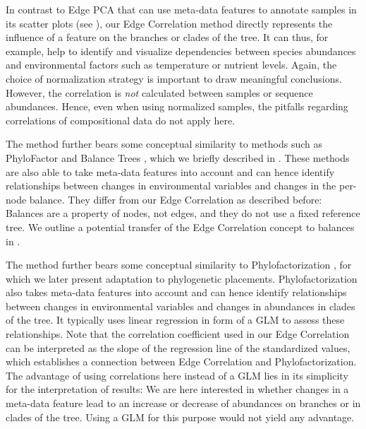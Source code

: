 In contrast to Edge PCA \cite{Matsen2011a} that can use meta-data features to annotate samples in its scatter plots
(see ),
our Edge Correlation method directly represents the influence of a feature on the branches or clades of the tree.
It can thus, for example, help to identify and visualize dependencies
between species abundances and environmental factors such as temperature or nutrient levels.
Again, the choice of normalization strategy is important to draw meaningful conclusions.
However, the correlation is \emph{not} calculated between samples or sequence abundances.
Hence, even when using normalized samples, %
the pitfalls regarding correlations of compositional data \cite{Lovell2015} do not apply here.


The method further bears some conceptual similarity to methods
such as Phylo\-Factor \cite{Washburne2017a} and Balance Trees \cite{Morton2017},
which we briefly described in .
These methods are also able to take meta-data features into account and
can hence identify relationships between changes in environmental variables and changes in the per-node balance.
They differ from our Edge Correlation as described before:
Balances are a property of nodes, not edges, and they do not use a fixed reference tree.
We outline a potential transfer of the Edge Correlation concept to balances in .


The method further bears some conceptual similarity to Phylofactorization \cite{Washburne2017a},
for which we later present adaptation to phylogenetic placements.
Phylofactorization also takes meta-data features into account and can hence identify relationships
between changes in environmental variables and changes in abundances in clades of the tree.
It typically uses linear regression in form of a \acf{GLM} to assess these relationships.
Note that the correlation coefficient used in our Edge Correlation
can be interpreted as the slope of the regression line of the standardized values,
which establishes a connection between Edge Correlation and Phylofactorization.
The advantage of using correlations here instead of a \ac{GLM} lies in its simplicity for the interpretation of results:
We are here interested in whether changes in a meta-data feature
lead to an increase or decrease of abundances on branches or in clades of the tree.
Using a \ac{GLM} for this purpose would not yield any advantage.

